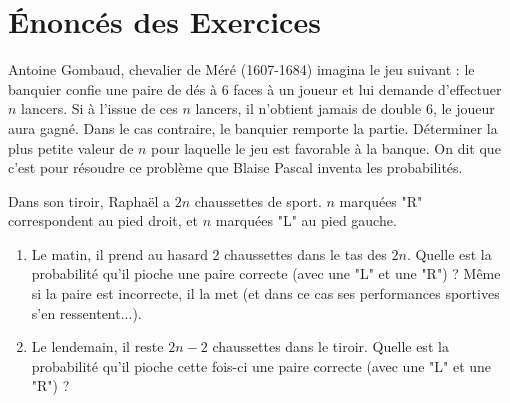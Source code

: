 \section{Énoncés des Exercices}

\begin{exercice}
Antoine Gombaud, chevalier de Méré (1607-1684) imagina le jeu suivant : le banquier confie une paire de dés à 6 faces à un joueur et lui demande d'effectuer $n$ lancers. Si à l'issue de ces $n$ lancers, il n'obtient jamais de double 6, le joueur aura gagné. Dans le cas contraire, le banquier remporte la partie. Déterminer la plus petite valeur de $n$ pour laquelle le jeu est favorable à la banque.
On dit que c'est pour résoudre ce problème que Blaise Pascal inventa les probabilités.
\end{exercice}

\begin{exercice}
Dans son tiroir, Raphaël a $2n$ chaussettes de sport. $n$ marquées "R" correspondent au pied droit, et $n$ marquées "L" au pied gauche.
\begin{enumerate}
    \item Le matin, il prend au hasard 2 chaussettes dans le tas des $2n$. Quelle est la probabilité qu'il pioche une paire correcte (avec une "L" et une "R") ? Même si la paire est incorrecte, il la met (et dans ce cas ses performances sportives s'en ressentent...).
    \item Le lendemain, il reste $2n-2$ chaussettes dans le tiroir. Quelle est la probabilité qu'il pioche cette fois-ci une paire correcte (avec une "L" et une "R") ?
\end{enumerate}
\end{exercice}

